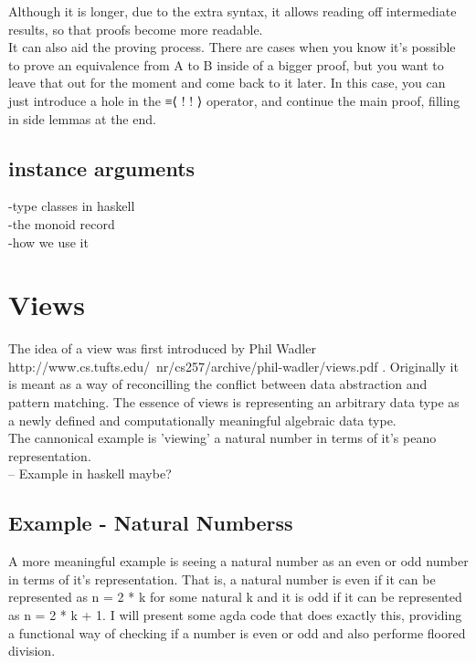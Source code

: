 \documentclass[12pt,twoside,notitlepage]{report}
\begin{document}
  Although it is longer, due to the extra syntax, it allows reading off intermediate results, so that
  proofs become more readable. \\
  It can also aid the proving process. There are cases when you know it's
  possible to prove an equivalence from A to B inside of a bigger proof, but you want to leave that out
  for the moment and come back to it later.
  In this case, you can just introduce a hole in the ≡⟨ {!   !} ⟩ operator, and continue the main proof,
  filling in side lemmas at the end.


\subsection{instance arguments}

-type classes in haskell\\
-the monoid record\\
-how we use it\\

\section{Views}

 The idea of a view was first introduced by Phil Wadler \cite{wadler} http://www.cs.tufts.edu/~nr/cs257/archive/phil-wadler/views.pdf . Originally
   it is meant as a way of reconcilling the conflict between data abstraction and pattern matching. The essence of views is representing an arbitrary
   data type as a newly defined and computationally meaningful algebraic data type. \\
 The cannonical example is 'viewing' a natural number in terms of it's peano representation. \\
 -- Example in haskell maybe?

 
\subsection{Example - Natural Numberss} 
 A more meaningful example is seeing a natural number as an even or odd number in terms of it's representation. That is, a
 natural number is even if it can be represented as n = 2 * k for some natural k and it is odd if it can be represented as
 n = 2 * k + 1.
 I will present some agda code that does exactly this, providing a functional way of checking if a number is even or odd and also
 performe floored division.
\end{document}
